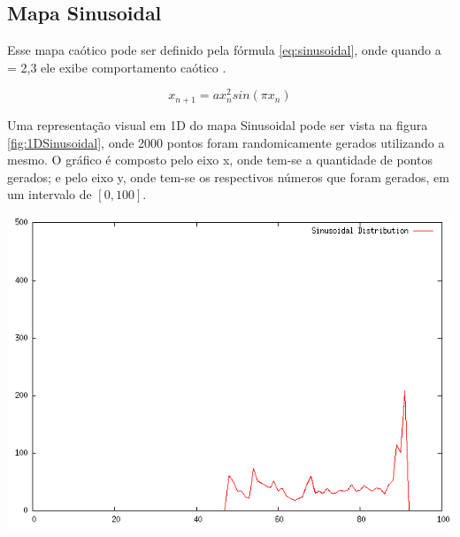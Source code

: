 

\subsection{Mapa Sinusoidal}

Esse mapa caótico pode ser definido pela fórmula \ref{eq:sinusoidal}, onde quando a = 2,3 ele exibe comportamento caótico \cite{gandomi}.

\begin{equation}
\label{eq:sinusoidal}
x_{n + 1} = a x_{n}^{2} sin(\pi x_{n})
\end{equation}

Uma representação visual em 1D do mapa Sinusoidal pode ser vista na figura \ref{fig:1DSinusoidal}, onde 2000 pontos foram randomicamente gerados utilizando a mesmo. O gráfico é composto pelo eixo x, onde tem-se a quantidade de pontos gerados; e pelo eixo y, onde tem-se os respectivos números que foram gerados, em um intervalo de $[0, 100]$.

{
    \centering
    \includegraphics[width=0.55\linewidth]{figuras/DistribuicaoSinusoidal.png}
    \label{fig:1DSinusoidal}
}

